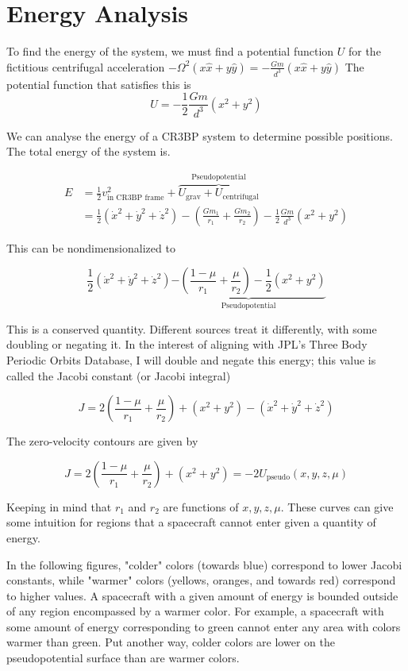 \documentclass{article}
\begin{document}
\section*{Energy Analysis}

To find the energy of the system, we must find a potential function $U$ for the fictitious centrifugal acceleration $-\Omega^2 \left(x\hat{x}+y\hat{y}\right)=-\frac{Gm}{d^3}\left(x\hat{x}+y\hat{y}\right)$ The potential function that satisfies this is
\[U=-\frac{1}{2}\frac{Gm}{d^3}\left(x^2+y^2\right)\]

We can analyse the energy of a CR3BP system to determine possible positions. The total energy of the system is.

\[\begin{aligned}
    E&=\frac{1}{2}v_\text{in CR3BP frame}^2+\overbrace{U_\text{grav}+U_\text{centrifugal}}^\text{Pseudopotential}\\
    &=\frac{1}{2}\left(\dot{x}^2+\dot{y}^2+\dot{z}^2\right)-\left(\frac{Gm_1}{r_1}+\frac{Gm_2}{r_2}\right)-\frac{1}{2}\frac{Gm}{d^3}\left(x^2+y^2\right)
\end{aligned}\]

This can be nondimensionalized to

\[\frac{1}{2}\left(\dot{x}^2+\dot{y}^2+\dot{z}^2\right)\underbrace{-\left(\frac{1-\mu}{r_1}+\frac{\mu}{r_2}\right)-\frac{1}{2}\left(x^2+y^2\right)}_\text{Pseudopotential}\]

This is a conserved quantity. Different sources treat it differently, with some doubling or negating it. In the interest of aligning with JPL's Three Body Periodic Orbits Database, I will double and negate this energy; this value is called the Jacobi constant (or Jacobi integral)

\[\boxed{J=2\left(\frac{1-\mu}{r_1}+\frac{\mu}{r_2}\right)+\left(x^2+y^2\right)-\left(\dot{x}^2+\dot{y}^2+\dot{z}^2\right)}\]

The zero-velocity contours are given by

\[J=2\left(\frac{1-\mu}{r_1}+\frac{\mu}{r_2}\right)+\left(x^2+y^2\right)=-2U_\text{pseudo}(x,y,z,\mu)\]

Keeping in mind that $r_1$ and $r_2$ are functions of $x, y, z, \mu$. These curves can give some intuition for regions that a spacecraft cannot enter given a quantity of energy.

In the following figures, "colder" colors (towards blue) correspond to lower Jacobi constants, while "warmer" colors (yellows, oranges, and towards red) correspond to higher values. A spacecraft with a given amount of energy is bounded outside of any region encompassed by a warmer color. For example, a spacecraft with some amount of energy corresponding to green cannot enter any area with colors warmer than green. Put another way, colder colors are lower on the pseudopotential surface than are warmer colors. 
\end{document}
